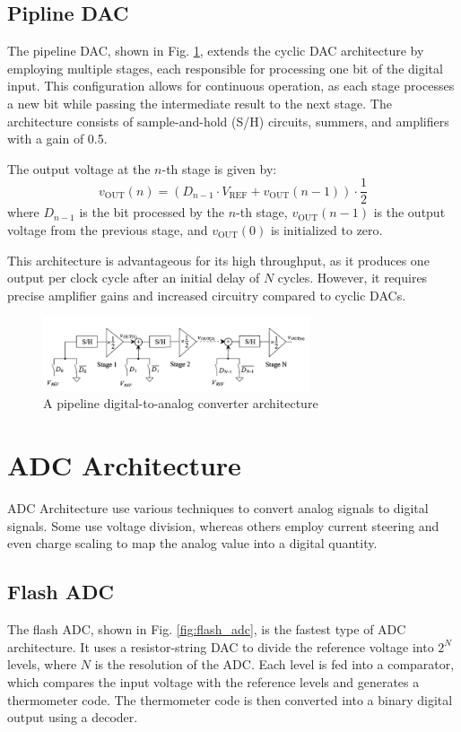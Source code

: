\subsection{Pipline DAC}
The pipeline DAC, shown in Fig. \ref{fig:pipeline_dac}, extends the cyclic DAC architecture by employing multiple stages, each responsible for processing one bit of the digital input. This configuration allows for continuous operation, as each stage processes a new bit while passing the intermediate result to the next stage. The architecture consists of sample-and-hold (S/H) circuits, summers, and amplifiers with a gain of 0.5.

The output voltage at the $n$-th stage is given by:
\begin{equation}
v_{\text{OUT}}(n) = \left( D_{n-1} \cdot V_{\text{REF}} + v_{\text{OUT}}(n-1) \right) \cdot \frac{1}{2}
\end{equation}
where $D_{n-1}$ is the bit processed by the $n$-th stage, $v_{\text{OUT}}(n-1)$ is the output voltage from the previous stage, and $v_{\text{OUT}}(0)$ is initialized to zero.

This architecture is advantageous for its high throughput, as it produces one output per clock cycle after an initial delay of $N$ cycles. However, it requires precise amplifier gains and increased circuitry compared to cyclic DACs.

\begin{figure}[H]
	\centering
	\includegraphics[width=0.7\textwidth]{figs/pipeline_dac.png}
	\caption{A pipeline digital-to-analog converter architecture}
	\label{fig:pipeline_dac}
	\vspace{0.5cm}
\end{figure}
\section{ADC Architecture}
\label{sec:adc_architecture}
ADC Architecture use various techniques to convert analog signals to digital signals.
Some use voltage division, whereas others employ current
steering and even charge scaling to map the analog value into a digital quantity.
\subsection{Flash ADC}
The flash ADC, shown in Fig. \ref{fig:flash_adc}, is the fastest type of ADC architecture. It uses a resistor-string DAC to divide the reference voltage into $2^N$ levels, where $N$ is the resolution of the ADC. Each level is fed into a comparator, which compares the input voltage with the reference levels and generates a thermometer code. The thermometer code is then converted into a binary digital output using a decoder.

